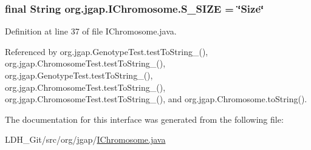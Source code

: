 \hypertarget{interfaceorg_1_1jgap_1_1_i_chromosome_a50371491243a21f494112bf66d2e1a26}{
\subsubsection[{S\-\_\-\-S\-I\-Z\-E}]{\setlength{\rightskip}{0pt plus 5cm}final String org.\-jgap.\-I\-Chromosome.\-S\-\_\-\-S\-I\-Z\-E = \char`\"{}Size\char`\"{}\hspace{0.3cm}{\ttfamily [static]}}}\label{interfaceorg_1_1jgap_1_1_i_chromosome_a50371491243a21f494112bf66d2e1a26}


Definition at line 37 of file I\-Chromosome.\-java.



Referenced by org.\-jgap.\-Genotype\-Test.\-test\-To\-String\-\_(), org.\-jgap.\-Chromosome\-Test.\-test\-To\-String\-\_(), org.\-jgap.\-Genotype\-Test.\-test\-To\-String\-\_(), org.\-jgap.\-Chromosome\-Test.\-test\-To\-String\-\_(), org.\-jgap.\-Chromosome\-Test.\-test\-To\-String\-\_(), and org.\-jgap.\-Chromosome.\-to\-String().



The documentation for this interface was generated from the following file\-:\begin{DoxyCompactItemize}
\item 
L\-D\-H\-\_\-\-Git/src/org/jgap/\hyperlink{_i_chromosome_8java}{I\-Chromosome.\-java}\end{DoxyCompactItemize}
